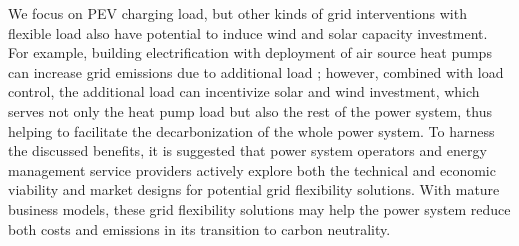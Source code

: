 \documentclass[9pt,twocolumn,twoside,lineno]{pnas-new}
\begin{document}
We focus on PEV charging load, but other kinds of grid interventions with flexible load also have potential to induce wind and solar capacity investment. For example, building electrification with deployment of air source heat pumps can increase grid emissions due to additional load \cite{dai_life_2020,liu_energetic_2019,carroll_air_2020}; however, combined with load control, the additional load can incentivize solar and wind investment, which serves not only the heat pump load but also the rest of the power system, thus helping to facilitate the decarbonization of the whole power system. To harness the discussed benefits, it is suggested that power system operators and energy management service providers actively explore both the technical and economic viability and market designs for potential grid flexibility solutions. With mature business models, these grid flexibility solutions may help the power system reduce both costs and emissions in its transition to carbon neutrality.


\end{document}
